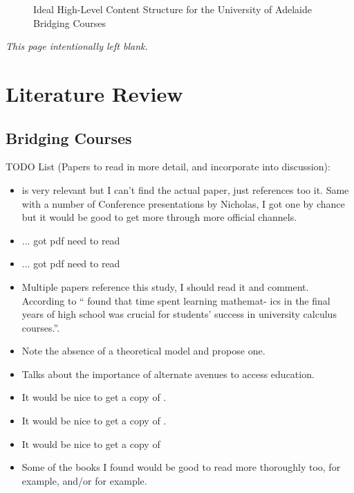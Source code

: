 \documentclass[twoside,12pt,a4paper]{report}
\makeatletter
\newcommand*{\intentionallyblankpage}{
  \vspace*{\fill}
  {\centering \textit{This page intentionally left blank.} \par}
  \vspace{\fill}}
\renewcommand*{\cleardoublepage}{\clearpage\if@twoside \ifodd\c@page\else
  \intentionallyblankpage
  \newpage
  \if@twocolumn\hbox{}\newpage\fi\fi\fi}
\makeatother
\begin{document}
\begin{figure}
\begin{center}
\end{center}
\caption{Ideal High-Level Content Structure for the University of Adelaide Bridging Courses \label{fig:contentStructure}}
\end{figure}







\cleardoublepage
\chapter{Literature Review}
\label{chap:literature}


\section{Bridging Courses}

TODO List (Papers to read in more detail, and incorporate into discussion):
\begin{itemize}
	\item \cite{Nicholas2015} is very relevant but I can't find the actual paper, just references too it. Same with a number of Conference presentations by Nicholas, I got one by chance but it would be good to get more through more official channels.
	\item \cite{Gordon2015} ... got pdf need to read
	\item \cite{Nicholas2015b} ... got pdf need to read
	\item \cite{Kajander2005} Multiple papers reference this study, I should read it and comment. According to \cite{Gordon2013} ``\cite{Kajander2005} found that time spent learning mathemat-
ics in the final years of high school was crucial for students’ success in
university calculus courses.''.
	\item \cite{Clark2008} Note the absence of a theoretical model and propose one.
	\item \cite{Irwin2018} Talks about the importance of alternate avenues to access education.
	\item It would be nice to get a copy of \cite{Vygotsky1978}.
	\item It would be nice to get a copy of \cite{Wood2001}.
	\item It would be nice to get a copy of \cite{Bandura1997}
	\item Some of the books I found would be good to read more thoroughly too, \cite{Volmink1994} for example, and/or \cite{McGivney1996} for example.
\end{itemize}
\end{document}
